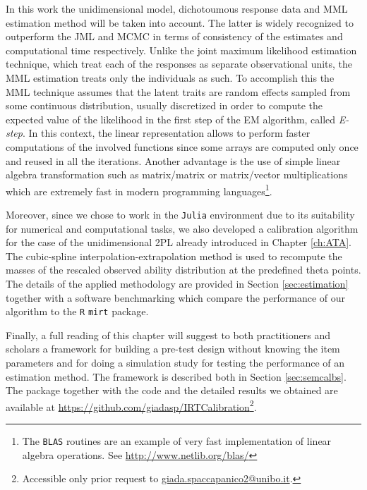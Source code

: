 In this work the unidimensional model, dichotoumous response data and MML estimation method will be taken into account. The latter is widely recognized to outperform the JML and MCMC in terms of consistency of the estimates \parencite{andersen1977sufficient, neyman1948consistent} and computational time  \parencite{patz1999applications} respectively. Unlike the joint maximum likelihood estimation technique, which treat each of the responses as separate observational units, the MML estimation treats only the individuals as such. To accomplish this the MML technique assumes that the latent traits are random effects sampled from some continuous distribution, usually discretized in order to compute the expected value of the likelihood in the first step of the EM algorithm, called \emph{E-step}. In this context, the linear representation allows to perform faster computations of the involved functions since some arrays are computed only once and reused in all the iterations. Another advantage is the use of simple linear algebra transformation such as matrix/matrix or matrix/vector multiplications which are extremely fast in modern programming languages\footnote{The \texttt{BLAS} routines are an example of very fast implementation of linear algebra operations. See  \url{http://www.netlib.org/blas/}}. 

Moreover, since we chose to work in the \texttt{Julia} environment due to its suitability for numerical and computational tasks, we also developed a calibration algorithm for the case of the unidimensional 2PL already introduced in Chapter \ref{ch:ATA}. The cubic-spline interpolation-extrapolation method \parencite{birkhoff1960smooth} is used to recompute the masses of the rescaled observed ability distribution at the predefined theta points. The details of the applied methodology are provided in Section \ref{sec:estimation} together with a software benchmarking which compare the performance of our algorithm to the \texttt{R} \texttt{mirt} package.

Finally, a full reading of this chapter will suggest to both practitioners and scholars a framework for building a pre-test design without knowing the item parameters and for doing a simulation study for testing the performance of an estimation method. The framework is described both in Section \ref{sec:semcalbs}. The package together with the code and the detailed results we obtained are available at \url{https://github.com/giadasp/IRTCalibration}\footnote{Accessible only prior request to \href{mailto:giada.spaccapanico2@unibo.it}{giada.spaccapanico2@unibo.it}.}.

